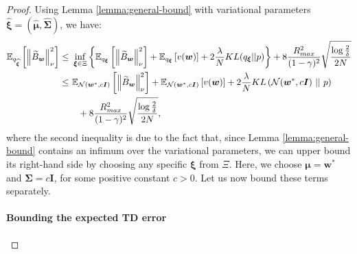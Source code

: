 \documentclass{article}
\newcommand{\wt}[1]{\widetilde{#1}}
\newcommand{\wh}[1]{\widehat{#1}}
\newcommand{\norm}[1]{\left\lVert #1 \right\rVert}
\begin{document}
\begin{proof}
Using Lemma \ref{lemma:general-bound} with variational parameters $\wh{\bm{\xi}} = (\wh{\bm{\mu}},\wh{\bm{\Sigma}})$, we have:
\begin{align}\label{eq:thg-4}
\mathbb{E}_{q_{\wh{\bm{\xi}}}}\left[ \norm{\wt B_{\bm{w}}}_{\nu}^2 \right ] \leq\ & \inf_{\bm{\xi} \in \Xi}\left\{ \mathbb{E}_{q_{\bm{\xi}}}\left[ \norm{\wt B_{\bm{w}}}_{\nu}^2 \right ] + \mathbb{E}_{q_{\bm{\xi}}}\left[ v(\bm{w}) \right] + 2\frac{\lambda}{N} KL({q_{\bm{\xi}}}||p) \right\} + 8\frac{R_{max}^2}{(1-\gamma)^2}\sqrt{\frac{\log\frac{2}{\delta}}{2N}}\notag\\ \leq\ & \mathbb{E}_{\mathcal{N}(\bm{w}^*,c\bm{I})}\left[ \norm{\wt B_{\bm{w}}}_{\nu}^2 \right ] + \mathbb{E}_{\mathcal{N}(\bm{w}^*,c\bm{I})}\left[ v(\bm{w}) \right] + 2\frac{\lambda}{N} KL\left(\mathcal{N}(\bm{w}^*,c\bm{I})\ ||\ p\right)\notag\\ &\ \ + 8\frac{R_{max}^2}{(1-\gamma)^2}\sqrt{\frac{\log\frac{2}{\delta}}{2N}},
\end{align}
where the second inequality is due to the fact that, since Lemma \ref{lemma:general-bound} contains an infimum over the variational parameters, we can upper bound its right-hand side by choosing any specific $\bm{\xi}$ from $\Xi$. Here, we choose $\bm{\mu} = \bm{w}^*$ and $\bm{\Sigma} = c\bm{I}$, for some positive constant $c>0$. Let us now bound these terms separately.

\paragraph*{Bounding the expected TD error}


\end{proof}
\end{document}
